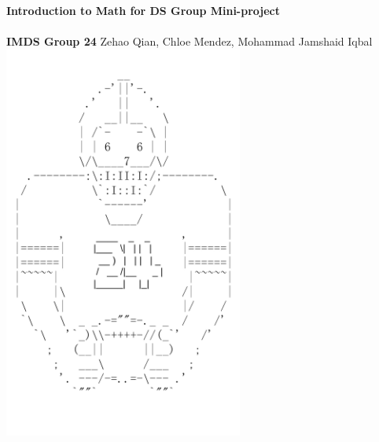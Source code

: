 % 
\begin{titlepage}
    \centering
    \vspace*{\fill}
    \textbf{\fontsize{17.28}{18}\selectfont Introduction to Math for DS Group Mini-project} \\
    \vspace{0.5cm}
    \fontsize{14}{16}\selectfont{Analysis of factors affecting Premier League match results} \\
    \vspace{1.5cm}
    \textbf{IMDS Group 24}
    \vfill
    Zehao Qian, Chloe Mendez, Mohammad Jamshaid Iqbal \\
    \vspace{0.9cm}
    \vspace{0.9cm}
    \vspace{0.9cm}
    \includegraphics[height=13cm]{pic/cover_pic.png}
    \vspace*{\fill}
\end{titlepage}
% 